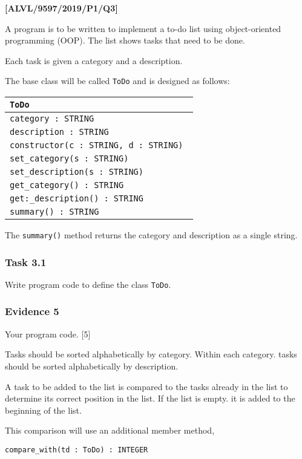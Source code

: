 \item \textbf{{[}ALVL/9597/2019/P1/Q3{]} }

A program is to be written to implement a to-do list using object-oriented
programming (OOP). The list shows tasks that need to be done.

Each task is given a category and a description.

The base class will be called \texttt{ToDo} and is designed as follows: 
\begin{center}
\begin{tabular}{|l|}
\hline 
\texttt{\hspace{0.25\columnwidth}ToDo}\tabularnewline
\hline 
\texttt{category : STRING }\tabularnewline
\texttt{description : STRING}\tabularnewline
\hline 
\texttt{constructor(c : STRING, d : STRING) }\tabularnewline
\texttt{set\_category(s : STRING)}\tabularnewline
\texttt{set\_description(s : STRING) }\tabularnewline
\texttt{get\_category() : STRING }\tabularnewline
\texttt{get:\_description() : STRING }\tabularnewline
\texttt{summary() : STRING}\tabularnewline
\hline 
\end{tabular}
\par\end{center}

The \texttt{summary()} method returns the category and description
as a single string.

\subsubsection*{Task 3.1}

Write program code to define the class \texttt{ToDo}.

\subsubsection*{Evidence 5}

Your program code. \hfill{}{[}5{]}

Tasks should be sorted alphabetically by category. Within each category.
tasks should be sorted alphabetically by description. 

A task to be added to the list is compared to the tasks already in
the list to determine its correct position in the list. If the list
is empty. it is added to the beginning of the list. 

This comparison will use an additional member method,
\begin{center}
\texttt{compare\_with(td : ToDo) : INTEGER }
\par\end{center}

